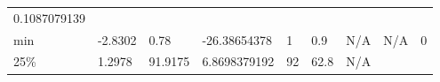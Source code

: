 \begin{longtable}[]{@{}lllllllll@{}}
\begin{minipage}[t]{0.11\columnwidth}
0.1087079139\strut
\end{minipage}\tabularnewline
\begin{minipage}[t]{0.05\columnwidth}\raggedright
min\strut
\end{minipage} & \begin{minipage}[t]{0.08\columnwidth}\raggedright
-2.8302\strut
\end{minipage} & \begin{minipage}[t]{0.09\columnwidth}\raggedright
0.78\strut
\end{minipage} & \begin{minipage}[t]{0.09\columnwidth}\raggedright
-26.38654378\strut
\end{minipage} & \begin{minipage}[t]{0.08\columnwidth}\raggedright
1\strut
\end{minipage} & \begin{minipage}[t]{0.09\columnwidth}\raggedright
0.9\strut
\end{minipage} & \begin{minipage}[t]{0.09\columnwidth}\raggedright
N/A\strut
\end{minipage} & \begin{minipage}[t]{0.08\columnwidth}\raggedright
N/A\strut
\end{minipage} & \begin{minipage}[t]{0.11\columnwidth}\raggedright
0\strut
\end{minipage}\tabularnewline
\begin{minipage}[t]{0.05\columnwidth}\raggedright
25\%\strut
\end{minipage} & \begin{minipage}[t]{0.08\columnwidth}\raggedright
1.2978\strut
\end{minipage} & \begin{minipage}[t]{0.09\columnwidth}\raggedright
91.9175\strut
\end{minipage} & \begin{minipage}[t]{0.09\columnwidth}\raggedright
6.8698379192\strut
\end{minipage} & \begin{minipage}[t]{0.08\columnwidth}\raggedright
92\strut
\end{minipage} & \begin{minipage}[t]{0.09\columnwidth}\raggedright
62.8\strut
\end{minipage} & \begin{minipage}[t]{0.09\columnwidth}\raggedright
N/A\strut
\end{minipage} & \begin{minipage}[t]{0.08\columnwidth}\raggedright

\end{minipage}
\end{longtable}
